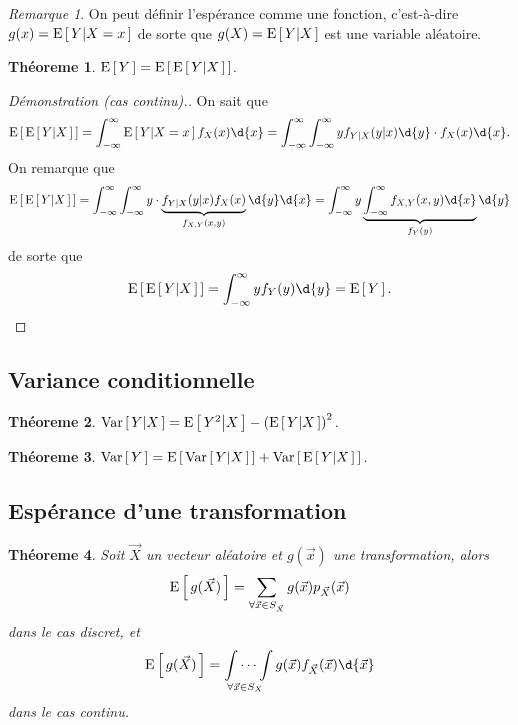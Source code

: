 \documentclass[11pt]{article}
\newcommand\Esp[1]{%
	\ensuremath{%
		\mathrm{E}\left[\,#1\,\right]%
	}%
}%
\newcommand\Espg[2]{%
	\ensuremath{%
		\mathrm{E}\left[\,#1\middle\vert#2\,\right]%
	}%
}%
\newcommand\Var[1]{%
	\ensuremath{%
		\mathrm{Var}\left[\,#1\,\right]%
	}%
}%
\newcommand\Varg[2]{%
	\ensuremath{%
		\mathrm{Var}\left[\,#1\middle\vert#2\,\right]%
	}%
}%
\newtheorem{theoreme}{Théoreme}[section]
\theoremstyle{remark}
\newtheorem*{remark}{Remarque}
\theoremstyle{definition}
\begin{document}
\begin{remark}
	On peut définir l'espérance comme une fonction, c'est-à-dire $g(x)=
	\Espg{Y}{X=x}$ de sorte que $g(X)=\Espg{Y}{X}$ est une variable aléatoire.
\end{remark}

\begin{theoreme}\label{th:esp_cond}
	$\Esp{Y}=\Esp{\Espg{Y}{X}}$.
\end{theoreme}

\begin{proof}[Démonstration (cas continu).]
	On sait que
	\begin{equation*}
		\Esp{\Espg{Y}{X}}
		=\int_{-\infty}^\infty\Espg{Y}{X=x}f_X(x)\d{x}
		=\int_{-\infty}^\infty\int_{-\infty}^\infty
         yf_{Y|X}(y|x)\d{y}\cdot f_X(x)\d{x}.
	\end{equation*}
	On remarque que
	\begin{equation*}
		\Esp{\Espg{Y}{X}}
		=\int_{-\infty}^\infty\int_{-\infty}^\infty
		 y\cdot\underbrace{f_{Y|X}(y|x)f_X(x)}_{f_{X,Y}(x,y)}\d{y}\d{x}
		=\int_{-\infty}^\infty y\underbrace{\int_{-\infty}^\infty
         f_{X,Y}(x,y)\d{x}}_{f_Y(y)}\d{y}
	\end{equation*}
	de sorte que
	\begin{equation*}
		\Esp{\Espg{Y}{X}}
		=\int_{-\infty}^\infty yf_Y(y)\d{y}
		=\Esp{Y}.\qedhere
	\end{equation*}
\end{proof}

\subsection{Variance conditionnelle}
\begin{theoreme}
	$\Varg{Y}{X}=\Espg{Y^2}{X}-\left(\Espg{Y}{X}\right)^2$.
\end{theoreme}

\begin{theoreme}
	$\Var{Y}=\Esp{\Varg{Y}{X}}+\Var{\Espg{Y}{X}}$.
\end{theoreme}

\subsection{Espérance d'une transformation}
\begin{theoreme}
	Soit $\vec{X}$ un vecteur aléatoire et $g(\vec{x})$ une transformation,
	alors
	\begin{equation*}
		\Esp{g(\vec{X})}=\sum_{\forall\vec{x}\in S_{\vec{X}}}
		g(\vec{x})p_{\vec{X}}(\vec{x})
	\end{equation*}
	dans le cas discret, et
	\begin{equation*}
		\Esp{g(\vec{X})}=\idotsint\limits_{\forall\vec{x}\in S_X}
		g(\vec{x})f_{\vec{X}}(\vec{x})\d{\vec{x}}
	\end{equation*}
	dans le cas continu.
\end{theoreme}
\end{document}
